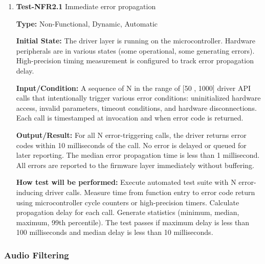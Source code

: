 \documentclass[12pt, titlepage]{article}
\begin{document}
\begin{enumerate}

\item{\textbf{Test-NFR2.1} Immediate error propagation\\}

\textbf{Type:} Non-Functional, Dynamic, Automatic
					
\textbf{Initial State:} 
The driver layer is running on the microcontroller. Hardware peripherals are in
various states (some operational, some generating errors). High-precision timing
measurement is configured to track error propagation delay.
					
\textbf{Input/Condition:} 
A sequence of N in the range of [50 , 1000] driver API calls that intentionally
trigger various error conditions: uninitialized hardware access, invalid
parameters, timeout conditions, and hardware disconnections. Each call is
timestamped at invocation and when error code is returned.
					
\textbf{Output/Result:} 
For all N error-triggering calls, the driver returns error codes within 10
milliseconds of the call. No error is delayed or queued for later reporting. The
median error propagation time is less than 1 millisecond. All errors are
reported to the firmware layer immediately without buffering.
					
\textbf{How test will be performed:} 
Execute automated test suite with N error-inducing driver calls. Measure time
from function entry to error code return using microcontroller cycle counters or
high-precision timers. Calculate propagation delay for each call. Generate
statistics (minimum, median, maximum, 99th percentile). The test passes if
maximum delay is less than 100 milliseconds and median delay is less than 10
milliseconds.

\end{enumerate}

\subsubsection{Audio Filtering}
\end{document}
